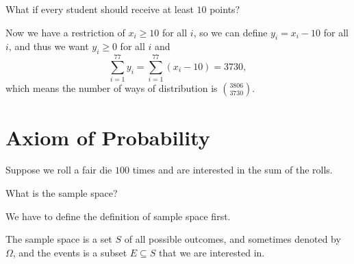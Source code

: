 \begin{eg}
    What if every student should receive at least \(10\) points? 
\end{eg}
\begin{explanation}
    Now we have a restriction of \(x_i \ge 10\) for all \(i\), so we can define \(y_i = x_i - 10\) for all \(i\), and thus we want \(y_i \ge 0\) for all \(i\) and 
    \[
        \sum_{i=1}^{77} y_i = \sum_{i=1}^{77} (x_i - 10) = 3730,  
    \]      
    which means the number of ways of distribution is \(\binom{3806}{3730}\). 

\end{explanation}

\chapter{Axiom of Probability}
Suppose we roll a fair die \(100\) times and are interested in the sum of the rolls. 
\begin{question}
    What is the sample space?
\end{question} 

We have to define the definition of sample space first. 

\begin{prev}
    The sample space is a set \(S\) of all possible outcomes, and sometimes denoted by \(\Omega \), and the events is a subset \(E \subseteq S\) that we are interested in.   
\end{prev}